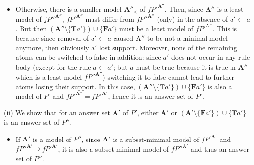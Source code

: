 \documentclass[11pt,fleqn,twoside]{article}
\newcommand{\T}{\mathbf{T}}
\newcommand{\F}{\mathbf{F}}
\newcommand{\Assignment}{\ensuremath{\mathbf{A}}}
\newcommand{\Program}{\ensuremath{P}}
\begin{document}
{\begin{itemize}
					\item Otherwise, there is a smaller model $\Assignment''_{<}$ of $f \Program'^{\Assignment''}$.
					Then, since $\Assignment''$ is a least model of $f \Program''^{\Assignment''}$, $f \Program'^{\Assignment''}$ must differ from $f \Program''^{\Assignment''}$ (only) in the absence of $a' \leftarrow a$.
					But then $(\Assignment'' \setminus\{ \T a' \}) \cup \{ \F a' \}$ must be a least model of $f \Program'^{\Assignment''}$.
					This is because since removal of $a' \leftarrow a$ caused $\Assignment''$ to be not a minimal model anymore, then obviously $a'$ lost support.
					Moreover, none of the remaining atoms can be switched to false in addition:
					since $a'$ does not occur in any rule body (except for the rule $a \leftarrow a'$; but $a$ must be true because it is true in $\Assignment''$ which is a least model $f \Program''^{\Assignment''}$)
					switching it to false cannot lead to further atoms losing their support.
					In this case, $(\Assignment'' \setminus\{ \T a' \}) \cup \{ \F a' \}$ is also a model of $\Program'$ and $f \Program'^{\Assignment''} = f \Program'^{\Assignment'}$, hence it is an answer set of $\Program'$.
				\end{itemize}
				
				(ii)
				We show that for an answer set $\Assignment'$ of $\Program'$, either $\Assignment'$ or $(\Assignment' \setminus\{ \F a' \}) \cup \{ \T a' \}$ is an answer set of $\Program''$.
				
				\begin{itemize}
					\item If $\Assignment'$ is a model of $\Program''$,
					since $\Assignment'$ is a subset-minimal model of $f \Program'^{\Assignment'}$
					and $f \Program''^{\Assignment'} \supseteq f \Program'^{\Assignment'}$, it is also a subset-minimal model of $f \Program''^{\Assignment'}$
					and thus an answer set of $\Program''$.
					

\end{itemize}}
\end{document}
